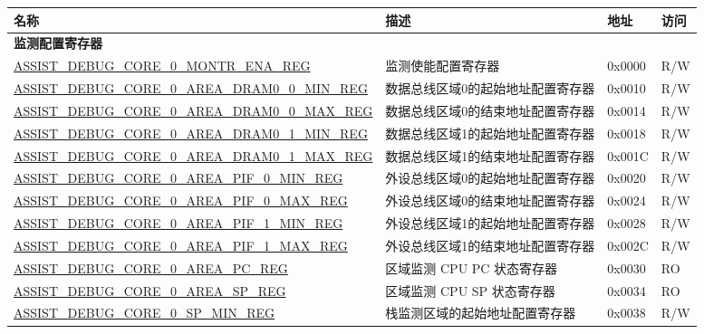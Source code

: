 \begin{longtable}{ | l| m{3.2cm} | l | l | }
\hline\rowcolor{lightgray}
{\bfseries 名称} & {\bfseries 描述} &  {\bfseries 地址} & {\bfseries 访问} \\ \hline
\endhead
\multicolumn{4}{|l|}{\textbf{监测配置寄存器}} \\ \hline
\hyperref[regdesc:ASSISTDEBUGCORE0MONTRENAREG]{ASSIST\_DEBUG\_CORE\_0\_MONTR\_ENA\_REG} & 监测使能配置寄存器 & 0x0000 & R/W \\ \hline
\hyperref[regdesc:ASSISTDEBUGCORE0AREADRAM00MINREG]{ASSIST\_DEBUG\_CORE\_0\_AREA\_DRAM0\_0\_MIN\_REG} & 数据总线区域0的起始地址配置寄存器 & 0x0010 & R/W \\ \hline
\hyperref[regdesc:ASSISTDEBUGCORE0AREADRAM00MAXREG]{ASSIST\_DEBUG\_CORE\_0\_AREA\_DRAM0\_0\_MAX\_REG} & 数据总线区域0的结束地址配置寄存器 & 0x0014 & R/W \\ \hline
\hyperref[regdesc:ASSISTDEBUGCORE0AREADRAM01MINREG]{ASSIST\_DEBUG\_CORE\_0\_AREA\_DRAM0\_1\_MIN\_REG} & 数据总线区域1的起始地址配置寄存器 & 0x0018 & R/W \\ \hline
\hyperref[regdesc:ASSISTDEBUGCORE0AREADRAM01MAXREG]{ASSIST\_DEBUG\_CORE\_0\_AREA\_DRAM0\_1\_MAX\_REG} & 数据总线区域1的结束地址配置寄存器 & 0x001C & R/W \\ \hline
\hyperref[regdesc:ASSISTDEBUGCORE0AREAPIF0MINREG]{ASSIST\_DEBUG\_CORE\_0\_AREA\_PIF\_0\_MIN\_REG} & 外设总线区域0的起始地址配置寄存器 & 0x0020 & R/W \\ \hline
\hyperref[regdesc:ASSISTDEBUGCORE0AREAPIF0MAXREG]{ASSIST\_DEBUG\_CORE\_0\_AREA\_PIF\_0\_MAX\_REG} & 外设总线区域0的结束地址配置寄存器 & 0x0024 & R/W \\ \hline
\hyperref[regdesc:ASSISTDEBUGCORE0AREAPIF1MINREG]{ASSIST\_DEBUG\_CORE\_0\_AREA\_PIF\_1\_MIN\_REG} & 外设总线区域1的起始地址配置寄存器 & 0x0028 & R/W \\ \hline
\hyperref[regdesc:ASSISTDEBUGCORE0AREAPIF1MAXREG]{ASSIST\_DEBUG\_CORE\_0\_AREA\_PIF\_1\_MAX\_REG} & 外设总线区域1的结束地址配置寄存器 & 0x002C & R/W \\ \hline
\hyperref[regdesc:ASSISTDEBUGCORE0AREAPCREG]{ASSIST\_DEBUG\_CORE\_0\_AREA\_PC\_REG} & 区域监测 CPU PC 状态寄存器 & 0x0030 & RO \\ \hline
\hyperref[regdesc:ASSISTDEBUGCORE0AREASPREG]{ASSIST\_DEBUG\_CORE\_0\_AREA\_SP\_REG} & 区域监测 CPU SP 状态寄存器 & 0x0034 & RO \\ \hline
\hyperref[regdesc:ASSISTDEBUGCORE0SPMINREG]{ASSIST\_DEBUG\_CORE\_0\_SP\_MIN\_REG} & 栈监测区域的起始地址配置寄存器 & 0x0038 &R/W \\ \hline

\end{longtable}
